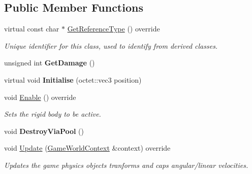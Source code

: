 \subsection*{Public Member Functions}
\begin{DoxyCompactItemize}
\item 
\hypertarget{class_arena_1_1_projectile_a3fae6cd923c73c5244a0ba07d3fe7896}{virtual const char $\ast$ \hyperlink{class_arena_1_1_projectile_a3fae6cd923c73c5244a0ba07d3fe7896}{Get\+Reference\+Type} () override}\label{class_arena_1_1_projectile_a3fae6cd923c73c5244a0ba07d3fe7896}

\begin{DoxyCompactList}\small\item\em Unique identifier for this class, used to identify from derived classes. \end{DoxyCompactList}\item 
\hypertarget{class_arena_1_1_projectile_a68c2602cb7f22b6cd42fd3320441ff46}{unsigned int {\bfseries Get\+Damage} ()}\label{class_arena_1_1_projectile_a68c2602cb7f22b6cd42fd3320441ff46}

\item 
\hypertarget{class_arena_1_1_projectile_a011321d476f72525f6bc52fd9baecd19}{virtual void {\bfseries Initialise} (octet\+::vec3 position)}\label{class_arena_1_1_projectile_a011321d476f72525f6bc52fd9baecd19}

\item 
\hypertarget{class_arena_1_1_projectile_a76a406a08c246337356b38e4cd9e101f}{void \hyperlink{class_arena_1_1_projectile_a76a406a08c246337356b38e4cd9e101f}{Enable} () override}\label{class_arena_1_1_projectile_a76a406a08c246337356b38e4cd9e101f}

\begin{DoxyCompactList}\small\item\em Sets the rigid body to be active. \end{DoxyCompactList}\item 
\hypertarget{class_arena_1_1_projectile_a7a87a9b2c4dfaa78bc8d610f1721f5dd}{void {\bfseries Destroy\+Via\+Pool} ()}\label{class_arena_1_1_projectile_a7a87a9b2c4dfaa78bc8d610f1721f5dd}

\item 
\hypertarget{class_arena_1_1_projectile_a2d7248cf20fce133ba6e44622e066a9c}{void \hyperlink{class_arena_1_1_projectile_a2d7248cf20fce133ba6e44622e066a9c}{Update} (\hyperlink{struct_arena_1_1_game_world_context}{Game\+World\+Context} \&context) override}\label{class_arena_1_1_projectile_a2d7248cf20fce133ba6e44622e066a9c}

\begin{DoxyCompactList}\small\item\em Updates the game physics objects tranforms and caps angular/linear velocities. \end{DoxyCompactList}\end{DoxyCompactItemize}
